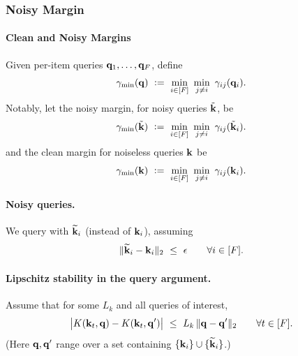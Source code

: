 \subsubsection{Noisy Margin}
\paragraph{Clean and Noisy Margins}
Given per-item queries ${\mathbf{q}}_{1},\dots,{\mathbf{q}}_{F}$, define 
\[
\gamma_{\min}(\vq)\ \defeq\ \min_{i\in[F]}\ \min_{j\neq i}\ \gamma_{ij}(\vq_{i}).
\]
Notably, let the noisy margin, for noisy queries $\tilde{{\mathbf{k}}}$, be
\[
\gamma_{\min}(\tilde{\vk})\ \defeq\ \min_{i\in[F]}\ \min_{j\neq i}\ \gamma_{ij}(\tilde{\vk}_{i}).
\]
and the clean margin for noiseless queries ${\mathbf{k}}$ be
\[
\gamma_{\min}(\vk)\ \defeq\ \min_{i\in[F]}\ \min_{j\neq i}\ \gamma_{ij}(\vk_{i}).
\]


\paragraph{Noisy queries.}
We query with $\widetilde{{\mathbf{k}}}_{i}$ (instead of ${\mathbf{k}}_{i}$), assuming
\begin{equation}
\norm{\widetilde{\vk}_{i}-\vk_i}_{2}\ \le\ \epsilon
\qquad \forall i\in[F].
\label{eq:noise-assump}
\end{equation}

\paragraph{Lipschitz stability in the query argument.}
Assume that for some $L_{k}$ and all queries of interest,
\begin{equation}
\big|K({\mathbf{k}}_{t},{\mathbf{q}})-K({\mathbf{k}}_{t},{\mathbf{q}}')\big|
\ \le\
L_{k}\,\|{\mathbf{q}}-{\mathbf{q}}' \|_{2}
\qquad \forall t\in[F].
\label{eq:Lipk}
\end{equation}
(Here ${\mathbf{q}},{\mathbf{q}}'$ range over a set containing $\{{\mathbf{k}}_{i}\}\cup\{\widetilde{{\mathbf{k}}}_{i}\}$.)

